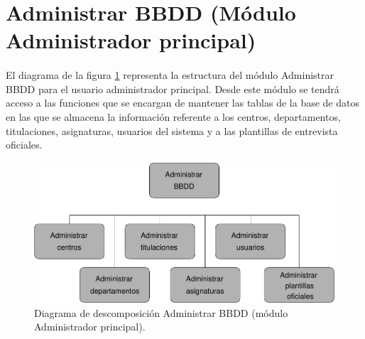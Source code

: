 \section{Administrar BBDD (Módulo Administrador principal)}

  \paragraph{}El diagrama de la figura
  \ref{diagramaDescomposicionAdministrarBBDD} representa la estructura del
  módulo Administrar BBDD para el usuario administrador principal. Desde este
  módulo se tendrá acceso a las funciones que se encargan de mantener las tablas
  de la base de datos en las que se almacena la información referente a los
  centros, departamentos, titulaciones, asignaturas, usuarios del sistema y
  a las plantillas de entrevista oficiales.

  \begin{figure}[!ht]
    \begin{center}
      \includegraphics[]{11.Disenyo_Arquitectonico/11.2.Diagramas_Descomposicion/11.2.2.Modulo_administrador_principal/AdministrarBBDD/Diagramas/administrar_bbdd.pdf}
      \caption{Diagrama de descomposición Administrar BBDD (módulo Administrador principal).}
      \label{diagramaDescomposicionAdministrarBBDD}
    \end{center}
  \end{figure}
